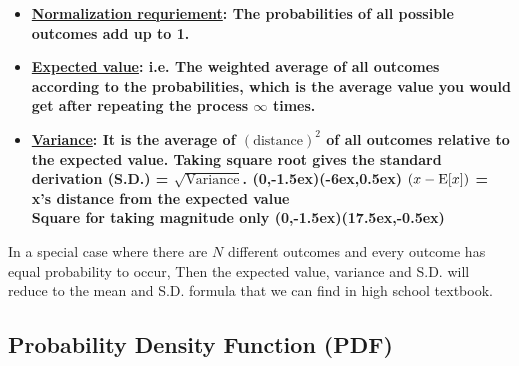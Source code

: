 \documentclass[class=article, crop=false, 12pt]{standalone}
\begin{document}
\begin{itemize}
    \item \bf{\ul{Normalization requriement}}:
    The probabilities of all possible outcomes add up to 1.

    \item \bf{\ul{Expected value}}: 
    i.e. The weighted average of all outcomes according to the probabilities,
    which is the average value you would get after repeating the process $\infty$ times.

    \item \bf{\ul{Variance}}:
    It is the average of $(\text{distance})^2$ of all outcomes relative to the expected value.
    Taking square root gives the \bf{standard derivation} (S.D.) = $\sqrt{\text{Variance}}$. 
    {(0,-1.5ex)}{(-6ex,0.5ex)}
    {\scriptsize $(x-\E{x})$ = x's distance from the expected value\\[-1ex] \scriptsize Square for taking magnitude only}
    {(0,-1.5ex)}{(17.5ex,-0.5ex)}
    
\end{itemize}

\begin{notation}
    In a special case where there are $N$ different outcomes and every outcome has equal probability to occur,
    Then the expected value, variance and S.D. will reduce to the mean and S.D. formula that we can find in high school textbook.

\end{notation}


\subsection{Probability Density Function (PDF)}
\end{document}
